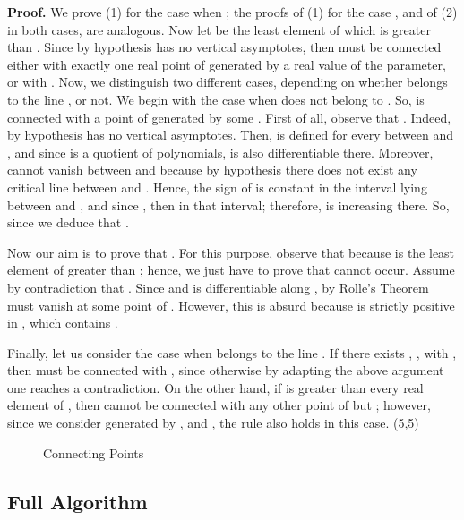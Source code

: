 \documentclass{elsart}
\def\qed{\hfill  \framebox(5,5){}}
\begin{document}
{\bf Proof.} We prove (1) for the case when ; the proofs
of (1) for the case , and of (2) in both cases, are
analogous. Now let  be the least element of
 which is greater than . Since by hypothesis
 has no vertical asymptotes, then  must be
connected either with exactly one real point of  generated by a real value of the parameter, or with
. Now, we distinguish two different cases, depending
on whether  belongs to the line , or not. We
begin with the case when  does not belong to .
So,  is connected with a point of  generated by some . First of
all, observe that . Indeed, by hypothesis
 has no vertical asymptotes. Then,  is defined
for every  between  and , and since 
is a quotient of polynomials,  is also differentiable
there. Moreover,  cannot vanish between  and
 because by hypothesis there does not exist any
critical line between  and . Hence, the sign of
 is constant in the interval lying between  and
, and since , then  in that interval; therefore,
 is increasing there. So, since 
we deduce that .

Now our aim is to prove that . For this purpose,
 observe that  because  is
the least element of  greater than ; hence,
we just have to prove that  cannot occur. Assume by
contradiction that . Since
 and  is differentiable along
, by Rolle's Theorem  must vanish at some
point of . However, this is absurd because
 is strictly positive in , which contains
.

Finally, let
us consider the case when  belongs to the line
. If there exists , , with , then  must be connected with
, since otherwise by adapting the above
argument one reaches a
contradiction. On the other hand,
if  is greater than every real element of ,
then  cannot be connected with any other point of  but ; however, since we consider
 generated by , and , the rule also
holds in this case. \qed




\begin{figure}[ht]
\begin{center}
\centerline{}
\end{center}
\caption{Connecting Points}
\end{figure}














\subsection{Full Algorithm} \label{algorit-planar}
\end{document}
